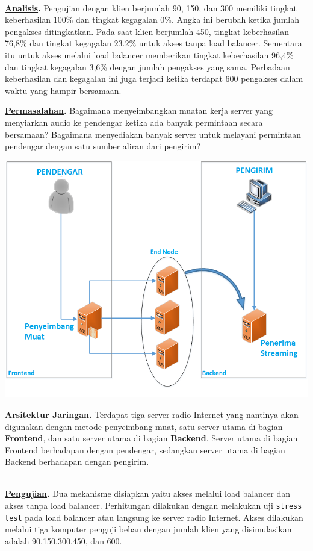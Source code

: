 \documentclass[a0,portrait]{a0poster}
\begin{document}
\begin{multicols}{2}
\begin{tcolorbox}[colback=blue!5!white,colframe=red!75!black,title=Pengujian]
	\ \\
	\textbf{\underline{Analisis}.} Pengujian dengan klien berjumlah 90, 150, dan 300 memiliki tingkat keberhasilan 100\% dan tingkat kegagalan 0\%. Angka ini berubah ketika jumlah pengakses ditingkatkan. Pada saat klien berjumlah 450, tingkat keberhasilan 76,8\% dan tingkat kegagalan 23.2\% untuk akses tanpa load balancer. Sementara itu untuk akses melalui load balancer memberikan tingkat keberhasilan 96,4\% dan tingkat kegagalan 3,6\% dengan jumlah pengakses yang sama. Perbadaan keberhasilan dan kegagalan ini juga terjadi ketika terdapat 600 pengakses dalam waktu yang hampir bersamaan.
		
		
\end{tcolorbox}

\begin{tcolorbox}[colback=blue!5!white,colframe=green!75!black,title=Metode]
	\textbf{\underline{Permasalahan}.} Bagaimana menyeimbangkan muatan kerja server yang	menyiarkan audio ke pendengar ketika ada banyak permintaan secara bersamaan? Bagaimana menyediakan banyak server untuk melayani permintaan pendengar dengan satu sumber aliran dari pengirim?
	
	\begin{center}
		\includegraphics[width=0.7\linewidth]{arsitektur}
	\end{center}

	\textbf{\underline{Arsitektur Jaringan}.} Terdapat tiga server radio Internet yang nantinya akan digunakan dengan metode penyeimbang muat, satu server utama di bagian \textbf{Frontend\textit{}}, dan satu server utama di bagian \textbf{Backend\textit{}}. Server utama di bagian Frontend berhadapan dengan pendengar, sedangkan server utama di bagian Backend berhadapan dengan pengirim.
	
	\ \\
	\textbf{\underline{Pengujian}.} Dua mekanisme disiapkan yaitu akses melalui load balancer dan akses tanpa load balancer. Perhitungan dilakukan dengan melakukan uji \texttt{stress test} pada load balancer atau langsung ke server radio Internet. Akses dilakukan melalui tiga komputer penguji beban dengan jumlah klien yang disimulasikan adalah 90,150,300,450, dan 600.
	



\end{tcolorbox}
\end{multicols}
\end{document}
